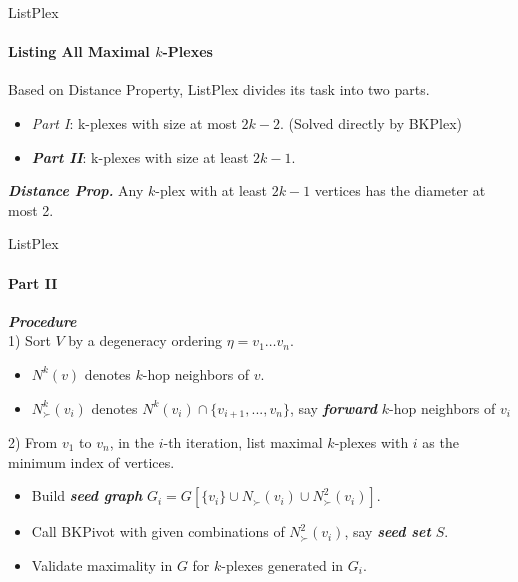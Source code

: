 \documentclass[9pt,notheorems]{beamer} %
\begin{document}
\begin{frame}{ListPlex}
    \framesubtitle{Listing All Maximal $k$-Plexes}
    Based on Distance Property, ListPlex divides its task into two parts.
    \begin{itemize}
        \item \emph{Part I}: k-plexes with size at most $2k-2$. \footnotesize (Solved directly by BKPlex) \normalsize
        \item \emph{\textbf{Part II}}: k-plexes with size at least $2k-1$.
    \end{itemize}
    \vspace{0.25cm}
    \begin{flushright}
        \footnotesize \textbf{\emph{Distance Prop.}} Any $k$-plex with at least $2k-1$ vertices has the diameter at most 2.
    \end{flushright}    
\end{frame}
\begin{frame}{ListPlex}
    \framesubtitle{Part II}
    \textbf{\emph{Procedure}}\\
    \vspace{0.25cm}
    1) Sort $V$ by a degeneracy ordering $\eta=v_1\dots v_n$.\\
    \begin{itemize}
        \item $N^k(v)$ denotes $k$-hop neighbors of $v$.
        \item $N^k_{\succ}(v_i)$ denotes $N^k(v_i) \cap \{v_{i+1},...,v_n\}$, say \textbf{\emph{forward}} $k$-hop neighbors of $v_i$
    \end{itemize}
    \vspace{0.2cm}
    2) From $v_1$ to $v_n$, in the $i$-th iteration, list maximal $k$-plexes with $i$ as the minimum index of vertices.
    \begin{itemize}
        \item Build \textbf{\emph{seed graph}} $G_i= G[\{v_i\}\cup  N_{\succ}(v_i) \cup N^2_{\succ}(v_i)]$.
        \item Call BKPivot with given combinations of $N^2_{\succ}(v_i)$, say \textbf{\emph{seed set}} $S$.
        \item Validate maximality in $G$ for $k$-plexes generated in $G_i$. 
    \end{itemize}
\end{frame}
\end{document}
